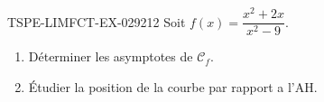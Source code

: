 \begin{exercice}{TSPE-LIMFCT-EX-029}{2}{12}
Soit $f(x) = \dfrac{x^2 + 2x}{x^2 - 9}$.
\begin{enumerate}
  \item Déterminer les asymptotes de $\mathcal{C}_f$.
  \item Étudier la position de la courbe par rapport a l'AH.
\end{enumerate}
\end{exercice}

